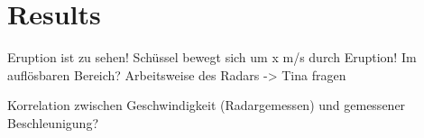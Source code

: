 \documentclass[12pt,a4paper]{scrartcl}
\begin{document}
\section{Results}

Eruption ist zu sehen!
Schüssel bewegt sich um x m/s durch Eruption! Im auflösbaren Bereich? Arbeitsweise des Radars -> Tina fragen

Korrelation zwischen Geschwindigkeit (Radargemessen) und gemessener Beschleunigung?


\clearpage
\newpage
\appendix


\end{document}
